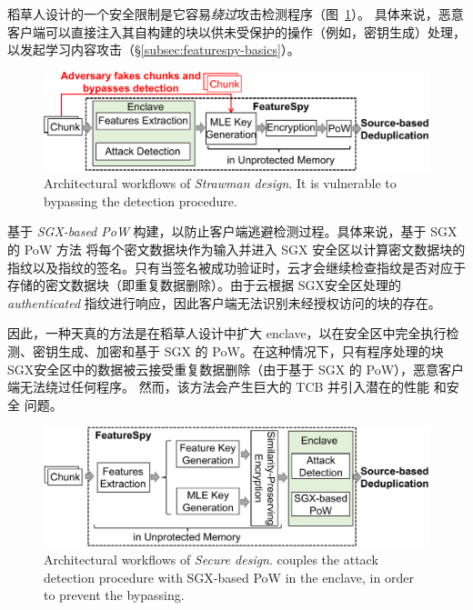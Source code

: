 稻草人设计的一个安全限制是它容易{\em 绕过}攻击检测程序（图~\ref{fig:featurespy-architecture-strawman}）。 具体来说，恶意客户端可以直接注入其自构建的块以供未受保护的操作（例如，密钥生成）处理，以发起学习内容攻击（\S\ref{subsec:featurespy-basics}）。


\begin{figure}
  \centering
  \includegraphics[width=\textwidth]{pic/featurespy/naive.pdf}
  \caption{Architectural workflows of \textit{Strawman design}. It is vulnerable to bypassing the detection procedure.}
  \label{fig:featurespy-architecture-strawman}
\end{figure}

\sysnameF 基于 {\em SGX-based PoW} \cite{ren21} 构建，以防止客户端逃避检测过程。具体来说，基于 SGX 的 PoW 方法 \cite{ren21} 将每个密文数据块作为输入并进入 SGX 安全区以计算密文数据块的指纹以及指纹的签名。只有当签名被成功验证时，云才会继续检查指纹是否对应于存储的密文数据块（即重复数据删除）。由于云根据 SGX安全区处理的 {\em authenticated} 指纹进行响应，因此客户端无法识别未经授权访问的块的存在。

因此，一种天真的方法是在稻草人设计中扩大 enclave，以在安全区中完全执行检测、密钥生成、加密和基于 SGX 的 PoW。在这种情况下，只有程序处理的块SGX安全区中的数据被云接受重复数据删除（由于基于 SGX 的 PoW），恶意客户端无法绕过任何程序。
然而，该方法会产生巨大的 TCB 并引入潜在的性能 \cite{arnautov16, harnik18, dinhngoc19} 和安全 \cite{lie05} 问题。

\begin{figure}
  \centering
  \includegraphics[width=\textwidth]{pic/featurespy/architecture.pdf}
  \caption{Architectural workflows of \textit{Secure design}. \sysnameF couples the attack detection procedure with SGX-based PoW \cite{ren21} in the enclave, in order to prevent the bypassing.}
  \label{fig:featurespy-architecture-secure}
\end{figure}

